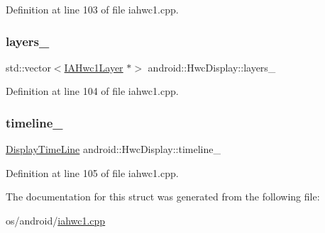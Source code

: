 Definition at line 103 of file iahwc1.\+cpp.

\mbox{\label{structandroid_1_1HwcDisplay_af86b0c8dd4767715caafb550a486b615}} 
\subsubsection{\texorpdfstring{layers\+\_\+}{layers\_}}
{\footnotesize\ttfamily std\+::vector$<$\mbox{\hyperlink{structandroid_1_1IAHwc1Layer}{I\+A\+Hwc1\+Layer}} $\ast$$>$ android\+::\+Hwc\+Display\+::layers\+\_\+}



Definition at line 104 of file iahwc1.\+cpp.

\mbox{\label{structandroid_1_1HwcDisplay_ae774424292626edbeaecba6596e8879a}} 
\subsubsection{\texorpdfstring{timeline\+\_\+}{timeline\_}}
{\footnotesize\ttfamily \mbox{\hyperlink{classhwcomposer_1_1DisplayTimeLine}{Display\+Time\+Line}} android\+::\+Hwc\+Display\+::timeline\+\_\+}



Definition at line 105 of file iahwc1.\+cpp.



The documentation for this struct was generated from the following file\+:\begin{DoxyCompactItemize}
\item 
os/android/\mbox{\hyperlink{iahwc1_8cpp}{iahwc1.\+cpp}}\end{DoxyCompactItemize}
